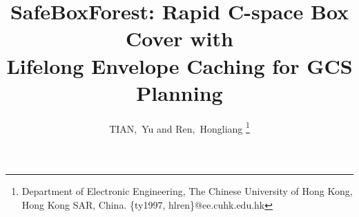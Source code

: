 \documentclass[journal]{IEEEtran}
\begin{document}
\title{SafeBoxForest: Rapid C-space Box Cover with\\
Lifelong Envelope Caching for GCS Planning}

\author{
  TIAN,~Yu and Ren,~Hongliang
  \thanks{Department of Electronic Engineering,
  The Chinese University of Hong Kong, Hong Kong SAR, China.
  \{ty1997, hlren\}@ee.cuhk.edu.hk}
}


\maketitle

\end{document}
